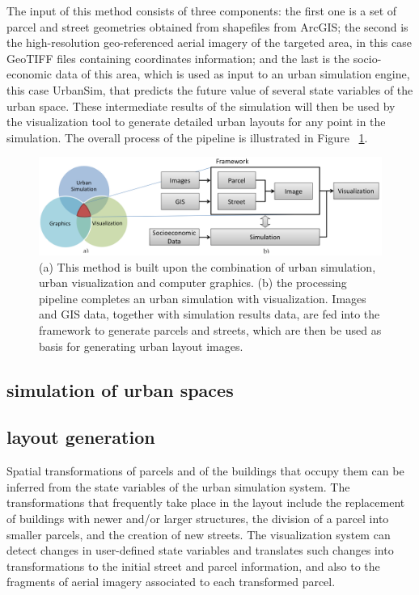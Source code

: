 \documentclass{egpubl}
\begin{document}
The input of this method consists of three components: the first one is a set of parcel and street geometries obtained from shapefiles from ArcGIS; the second is the high-resolution geo-referenced aerial imagery of the targeted area, in this case GeoTIFF files containing coordinates information; and the last is the socio-economic data of this area, which is used as input to an urban simulation engine, this case UrbanSim, that predicts the future value of several state variables of the urban space. These intermediate results of the simulation will then be used by the visualization tool to generate detailed urban layouts for any point in the simulation. The overall process of the pipeline is illustrated in Figure ~\ref{fig:star-5-1}.

\begin{figure}[htb]
  \centering
  \includegraphics[width=.95\linewidth]{star-5-1}
  \caption{\label{fig:star-5-1} (a) This method is built upon the combination of urban simulation, urban visualization and computer graphics. (b) the processing pipeline completes an urban simulation with visualization. Images and GIS data, together with simulation results data, are fed into the framework to generate parcels and streets, which are then be used as basis for generating urban layout images.}
\end{figure}

\subsection{simulation of urban spaces}

\subsection{layout generation}
Spatial transformations of parcels and of the buildings that occupy them can be inferred from the state variables of the urban simulation system. The transformations that frequently take place in the layout include the replacement of buildings with newer and/or larger structures, the division of a parcel into smaller parcels, and the creation of new streets. The visualization system can detect changes in user-defined state variables and translates such changes into transformations to the initial street and parcel information, and also to the fragments of aerial imagery associated to each transformed parcel.
\end{document}
